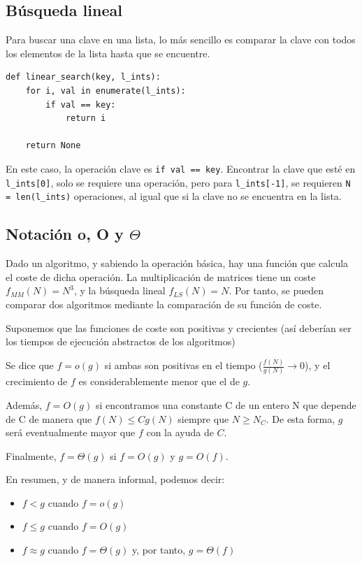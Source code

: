 \subsection{Búsqueda lineal}
Para buscar una clave en una lista, lo más sencillo es comparar la clave con todos los elementos de la lista hasta que se encuentre. 
\begin{lstlisting}
def linear_search(key, l_ints):
	for i, val in enumerate(l_ints):
		if val == key:
			return i
				
	return None
\end{lstlisting}

En este caso, la operación clave es \texttt{if val == key}. Encontrar la clave que esté en \texttt{l\_ints[0]}, solo se requiere una operación, pero para \texttt{l\_ints[-1]}, se requieren \texttt{N = len(l\_ints)} operaciones, al igual que si la clave no se encuentra en la lista.

\subsection{Notación o, O y $\Theta$}
Dado un algoritmo, y sabiendo la operación básica, hay una función que calcula el coste de dicha operación. La multiplicación de matrices tiene un coste $f_{MM} (N) = N^3$, y la búsqueda lineal $f_{LS}(N) = N$. Por tanto, se pueden comparar dos algoritmos mediante la comparación de su función de coste.  

Suponemos que las funciones de coste son positivas y crecientes (así deberían ser los tiempos de ejecución abstractos de los algoritmos)

Se dice que $f = o(g)$ si ambas son positivas en el tiempo ($\frac{f(N)}{g(N)} \rightarrow 0$), y el crecimiento de $f$ es considerablemente menor que el de $g$.

Además, $f = O(g)$ si encontramos una constante C de un entero N que depende de C de manera que $f(N) \leq Cg(N)$ siempre que $N \geq N_C$. De esta forma, $g$ será eventualmente mayor que $f$ con la ayuda de $C$.

Finalmente, $f = \Theta(g)$ si $f = O(g)$ y $g = O(f)$. 

En resumen, y de manera informal, podemos decir:
\begin{itemize}
\item $f < g$ cuando $f = o(g)$
\item $f \leq g$ cuando $f = O(g)$
\item $f \approx g$ cuando $f = \Theta(g)$ y, por tanto, $g = \Theta(f)$
\end{itemize}

